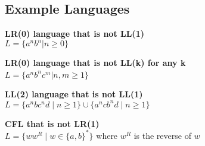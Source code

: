 
\begin{samepage}
\section{Example Languages}
\textbf{LR(0) language that is not LL(1)}\\
    $L = \{a^n b^n | n \geq 0\}$

\textbf{LR(0) language that is not LL(k) for any k}\\
$L = \{a^n b^n c^m | n, m \geq 1\} $\

\textbf{LL(2) language that is not LL(1)}\\
$L = \{ a^n b c^n d \mid n \geq 1 \} \cup \{ a^n c b^n d \mid n \geq 1 \}$

\textbf{CFL that is not LR(1)}\\
$ L = \{ w w^R \mid w \in \{a, b\}^* \} $ where $ w^R $ is the reverse of $ w $

\end{samepage}
